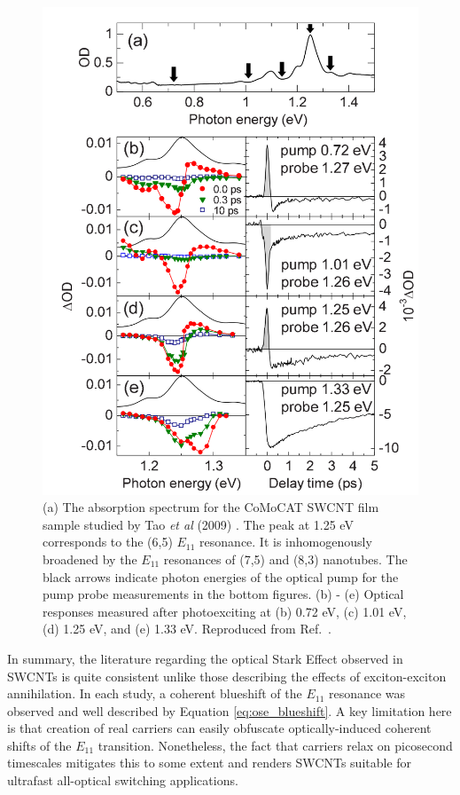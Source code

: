 \begin{figure}[ht]
	\centering
	\includegraphics[scale=0.25]{images/chapter_prior_works/abs_dtt_tao_2009}
	\caption{(a) The absorption spectrum for the CoMoCAT SWCNT film sample studied by Tao \textit{et al} (2009) \cite{tao2009subpicosecond}. The peak at 1.25 eV corresponds to the (6,5) $E_{11}$ resonance. It is inhomogenously broadened by the $E_{11}$ resonances of (7,5) and (8,3) nanotubes. The black arrows indicate photon energies of the optical pump for the pump probe measurements in the bottom figures. (b) - (e) Optical responses measured after photoexciting at (b) 0.72 eV, (c) 1.01 eV, (d) 1.25 eV, and (e) 1.33 eV.  Reproduced from Ref.\ \cite{tao2009subpicosecond}.}
	\label{fig:abs_dtt_tao_2009}
\end{figure}

In summary, the literature regarding the optical Stark Effect observed in SWCNTs is quite consistent unlike those describing the effects of exciton-exciton annihilation. In each study, a coherent blueshift of the $E_{11}$ resonance was observed and well described by Equation \eqref{eq:ose_blueshift}. A key limitation here is that creation of real carriers can easily obfuscate optically-induced coherent shifts of the $E_{11}$ transition. Nonetheless, the fact that carriers relax on picosecond timescales mitigates this to some extent and renders SWCNTs suitable for ultrafast all-optical switching applications.


